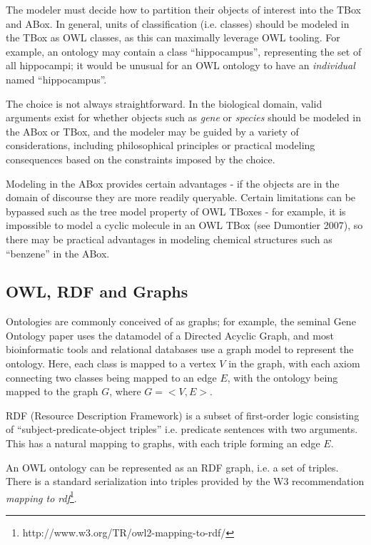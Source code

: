 \documentclass{my}
\begin{document}
The modeler must decide how to partition their objects of interest
into the TBox and ABox. In general, units of classification
(i.e. classes) should be modeled in the TBox as OWL classes, as this
can maximally leverage OWL tooling. For example, an ontology may
contain a class ``hippocampus'', representing the set of all
hippocampi; it would be unusual for an OWL ontology to have an
\emph{individual} named ``hippocampus''.

The choice is not always straightforward. In the biological domain,
valid arguments exist for whether objects such as \emph{gene} or
\emph{species} should be modeled in the ABox or TBox, and the modeler
may be guided by a variety of considerations, including philosophical
principles or practical modeling consequences based on the constraints
imposed by the choice. 

Modeling in the ABox provides certain advantages - if the objects are
in the domain of discourse they are more readily queryable. Certain
limitations can be bypassed such as the tree model property of OWL
TBoxes - for example, it is impossible to model a cyclic molecule in
an OWL TBox (see Dumontier 2007\cite{Dumontier2007}), so there may be
practical advantages in modeling chemical structures such as
``benzene'' in the ABox.

\subsection{OWL, RDF and Graphs}

Ontologies are commonly conceived of as graphs; for example, the
seminal Gene Ontology paper\cite{Ashburner2000} uses the datamodel of
a Directed Acyclic Graph, and most bioinformatic tools and relational
databases use a graph model to represent the
ontology\cite{Mungall2007}. Here, each class is mapped to a vertex $V$
in the graph, with each axiom connecting two classes being mapped to
an edge $E$, with the ontology being mapped to the graph $G$, where
$G=<V,E>$.

RDF (Resource Description Framework) is a subset of first-order logic
consisting of ``subject-predicate-object triples'' i.e. predicate
sentences with two arguments. This has a natural mapping to graphs,
with each triple forming an edge $E$.

An OWL ontology can be represented as an RDF graph, i.e. a set of
triples. There is a standard serialization into triples provided by
the W3 recommendation \emph{mapping to
  rdf}\footnote{http://www.w3.org/TR/owl2-mapping-to-rdf/}.
\end{document}
